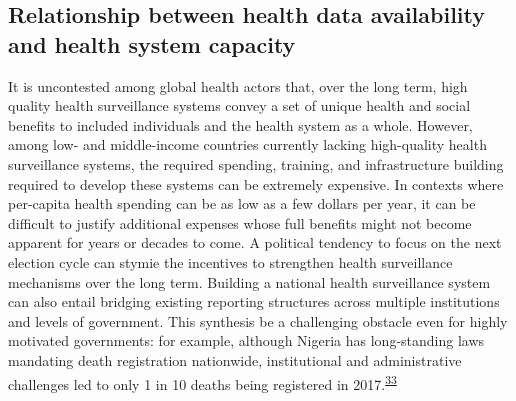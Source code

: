 \documentclass[
]{article}
\begin{document}
\hypertarget{relationship-between-health-data-availability-and-health-system-capacity}{%
\subsection{Relationship between health data availability and health system capacity}\label{relationship-between-health-data-availability-and-health-system-capacity}}

It is uncontested among global health actors that, over the long term, high quality health surveillance systems convey a set of unique health and social benefits to included individuals and the health system as a whole. However, among low- and middle-income countries currently lacking high-quality health surveillance systems, the required spending, training, and infrastructure building required to develop these systems can be extremely expensive. In contexts where per-capita health spending can be as low as a few dollars per year, it can be difficult to justify additional expenses whose full benefits might not become apparent for years or decades to come. A political tendency to focus on the next election cycle can stymie the incentives to strengthen health surveillance mechanisms over the long term. Building a national health surveillance system can also entail bridging existing reporting structures across multiple institutions and levels of government. This synthesis be a challenging obstacle even for highly motivated governments: for example, although Nigeria has long-standing laws mandating death registration nationwide, institutional and administrative challenges led to only 1 in 10 deaths being registered in 2017.\textsuperscript{\protect\hyperlink{ref-Makinde2020}{33}}
\end{document}
